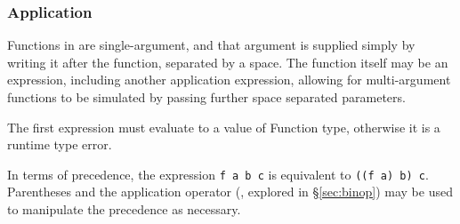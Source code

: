 \subsubsection{Application}

Functions in \Poetry{} are single-argument, and that argument is supplied
simply by writing it after the function, separated by a space. The function
itself may be an expression, including another application expression, allowing
for multi-argument functions to be simulated by passing further space separated
parameters.

\begin{bnf*}
\end{bnf*}

The first expression must evaluate to a value of Function type, otherwise
it is a runtime type error.

\begin{prooftree}
\end{prooftree}

In terms of precedence, the expression \texttt{f~a~b~c} is equivalent to
\texttt{((f~a)~b)~c}. Parentheses and the application operator (\op{|>},
explored in \S\ref{sec:binop}) may be used to manipulate the precedence as
necessary.
